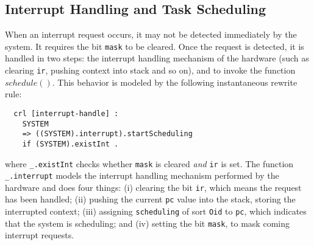 \documentclass[10pt,journal]{IEEEtran}
\begin{document}
\subsection{Interrupt Handling and Task Scheduling}
\label{ss:inthandling}
When an interrupt request occurs, it may not be detected immediately
by the system. It requires the bit \verb|mask| to be cleared. Once the
request is detected, it is handled in two steps: the interrupt
handling mechanism of the hardware (such as clearing \verb|ir|,
pushing context into stack and so on), and to invoke the function
$schedule()$. This behavior is modeled by the following instantaneous
rewrite rule:
\begin{verbatim}
  crl [interrupt-handle] :
    SYSTEM 
    => ((SYSTEM).interrupt).startScheduling
    if (SYSTEM).existInt .
\end{verbatim}
where \verb|_.existInt| checks whether \verb|mask| is cleared
\emph{and} \verb|ir| is set. The function \verb|_.interrupt| models
the interrupt handling mechanism performed by the hardware and does
four things: (i) clearing the bit \verb|ir|, which means the request
has been handled; (ii) pushing the current \verb|pc| value into the
stack, storing the interrupted context; (iii) assigning
\verb|scheduling| of sort \verb|Oid| to \verb|pc|, which indicates
that the system is scheduling; and (iv) setting the bit \verb|mask|,
to mask coming interrupt requests.
\end{document}
